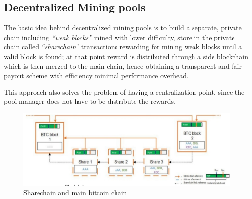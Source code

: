 \subsection{Decentralized Mining pools}
\begin{paracol}{2}
   
   The basic idea behind decentralized mining pools is to build a separate, private chain including \textit{``weak blocks''} mined with lower difficulty, store in the private chain called \textit{``sharechain''} transactions rewarding for mining weak blocks
   until a valid block is found;
   at that point reward is distributed through a side blockchain which is then merged to the main chain, hence obtaining a transparent and fair payout scheme with efficiency minimal performance overhead.

   This approach also solves the problem of having a centralization point, since the pool manager does not have to be distribute the rewards.

   \switchcolumn
   \colfill
   \begin{figure}[htbp]
      \centering
      \includegraphics{images/bitcoin_decentralized_pool.png}
      \caption{Sharechain and main bitcoin chain}
      \label{fig:bitcoin_decentralized_pool}
   \end{figure}
   \colfill

\end{paracol}